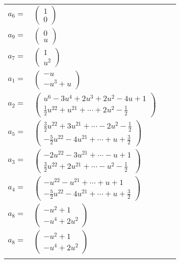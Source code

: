 \documentclass[1p]{elsarticle_modified}
\theoremstyle{definition}
\begin{document}
\begin{tabular}{m{7pt} m{180pt} m{7pt} m{180pt} }
\flushright $a_{6}=$&$\begin{pmatrix}1\\0\end{pmatrix}$ \\
\flushright $a_{9}=$&$\begin{pmatrix}0\\u\end{pmatrix}$ \\
\flushright $a_{7}=$&$\begin{pmatrix}1\\u^2\end{pmatrix}$ \\
\flushright $a_{1}=$&$\begin{pmatrix}- u\\- u^3+u\end{pmatrix}$ \\
\flushright $a_{2}=$&$\begin{pmatrix}u^6-3 u^4+2 u^3+2 u^2-4 u+1\\\frac{1}{2} u^{22}+u^{21}+\cdots+2 u^2-\frac{1}{2}\end{pmatrix}$ \\
\flushright $a_{5}=$&$\begin{pmatrix}\frac{3}{2} u^{22}+3 u^{21}+\cdots-2 u^2-\frac{1}{2}\\-\frac{5}{2} u^{22}-4 u^{21}+\cdots+u+\frac{3}{2}\end{pmatrix}$ \\
\flushright $a_{3}=$&$\begin{pmatrix}-2 u^{22}-3 u^{21}+\cdots- u+1\\\frac{3}{2} u^{22}+2 u^{21}+\cdots- u^2-\frac{1}{2}\end{pmatrix}$ \\
\flushright $a_{4}=$&$\begin{pmatrix}- u^{22}- u^{21}+\cdots+u+1\\-\frac{5}{2} u^{22}-4 u^{21}+\cdots+u+\frac{3}{2}\end{pmatrix}$ \\
\flushright $a_{8}=$&$\begin{pmatrix}- u^2+1\\- u^4+2 u^2\end{pmatrix}$\\ \flushright $a_{8}=$&$\begin{pmatrix}- u^2+1\\- u^4+2 u^2\end{pmatrix}$\\&\end{tabular}
\end{document}
